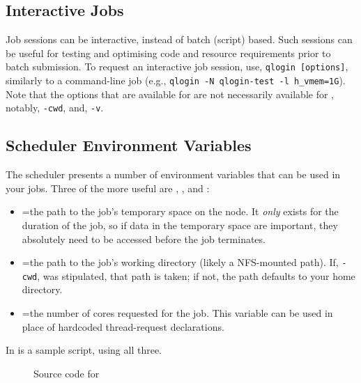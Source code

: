 \documentclass{easychair}
\begin{document}
\subsection{Interactive Jobs}

Job sessions can be interactive, instead of batch (script) based. Such sessions can be useful for testing and optimising code and resource requirements prior to batch submission. To request an interactive job session, use, \texttt{qlogin [options]}, similarly to a 
 command-line job (e.g., \texttt{qlogin -N qlogin-test -l h\_vmem=1G}). Note that the options that are available for  are not necessarily available for , notably, \texttt{-cwd}, and, \texttt{-v}. 

\subsection{Scheduler Environment Variables}

The scheduler presents a number of environment variables that can be used in your jobs. Three of the more useful are , , and :

\begin{itemize}
\item
{}=the path to the job's temporary space on the node. It \emph{only} exists for the duration of the job, so if data in the temporary space are important, they absolutely need to be accessed before the job terminates.

\item
{}=the path to the job's working directory (likely a NFS-mounted path). If, \texttt{-cwd}, was stipulated, that path is taken; if not, the path defaults to your home directory.

\item
{}=the number of cores requested for the job. This variable can be used in place of hardcoded thread-request declarations. 
\end{itemize}

\noindent
In  is a sample script, using all three.

\begin{figure}[htpb]
    
    \caption{Source code for }
	\label{fig:tmpdir.sh}
\end{figure}
\end{document}

